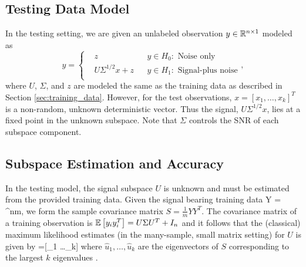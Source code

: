 \subsection{Testing Data Model}

In the testing setting, we are given an unlabeled observation $y\in\mathbb{R}^{n\times 1}$
modeled as
\begin{equation}\label{eq:determ_setup}
y=\left\{
\begin{aligned}
&z
&& y\in H_0:\text{ Noise only}\\
&U\Sigma^{1/2} x+z
&& y\in H_1:\text{ Signal-plus noise}\\
\end{aligned}\right. ,
\end{equation}
where $U$, $\Sigma$, and $z$ are modeled the same as the training data as described in
Section \ref{sec:training_data}. However, for the test observations, $x=[x_1,\dots,x_k]^T$
is a non-random, unknown deterministic vector. Thus the signal, $U\Sigma^{1/2}x$, lies at a
fixed point in the unknown subspace. Note that $\Sigma$ controls the SNR of each subspace
component.

\subsection{Subspace Estimation and Accuracy}\label{sec:param_estim}

In the testing model, the signal subspace $U$ is unknown and must be estimated from the
provided training data. Given the signal bearing training data 
\be
Y = \in\reals^{n\times m},
\ee 
we form the sample covariance matrix
$S=\frac{1}{m}YY^{T}$. The covariance matrix of a training observation is $\mathbb{E}\left[{y_iy_i^T}\right] = U\Sigma
U^T +I_n$ and it follows that the (classical) maximum likelihood estimates (in the many-sample, small
matrix setting) for $U$ is given by 
\beq\label{eq:param_estims_stoch}
=[_1 \dots {}_{k}] \eeq
where
$\widehat{u}_1,\dots,\widehat{u}_{k}$ are the eigenvectors of $S$ corresponding to the
largest $k$ eigenvalues \cite{muirhead1982aspects} .


